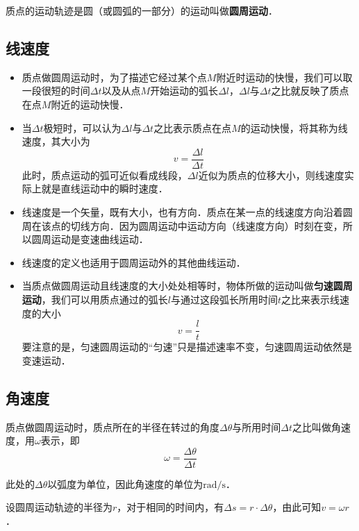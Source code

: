 
\begin{issues}
\issueDraft
\issueTODO
\end{issues}

质点的运动轨迹是圆（或圆弧的一部分）的运动叫做\textbf{圆周运动}．

\subsection{线速度}

\begin{itemize}
\item 质点做圆周运动时，为了描述它经过某个点$M$附近时运动的快慢，我们可以取一段很短的时间$\Delta t$以及从点$M$开始运动的弧长$\Delta l$，$\Delta l$与$\Delta t$之比就反映了质点在点$M$附近的运动快慢．

\item 当$\Delta t$极短时，可以认为$\Delta l$与$\Delta t$之比表示质点在点$M$的运动快慢，将其称为线速度，其大小为
\begin{equation}
v=\frac{\Delta l}{\Delta t}
\end{equation}
此时，质点运动的弧可近似看成线段，$\Delta l$近似为质点的位移大小，则线速度实际上就是直线运动中的瞬时速度．

\item 线速度是一个矢量，既有大小，也有方向．质点在某一点的线速度方向沿着圆周在该点的切线方向．因为圆周运动中运动方向（线速度方向）时刻在变，所以圆周运动是变速曲线运动．

\item 线速度的定义也适用于圆周运动外的其他曲线运动．

\item 当质点做圆周运动且线速度的大小处处相等时，物体所做的运动叫做\textbf{匀速圆周运动}，我们可以用质点通过的弧长$l$与通过这段弧长所用时间$t$之比来表示线速度的大小
\begin{equation}
v=\frac{l}{t}
\end{equation}
要注意的是，匀速圆周运动的“匀速”只是描述速率不变，匀速圆周运动依然是变速运动．
\end{itemize}

\subsection{角速度}

质点做圆周运动时，质点所在的半径在转过的角度$\Delta \theta$与所用时间$\Delta t$之比叫做角速度，用$\omega$表示，即
\begin{equation}
\omega = \frac{\Delta \theta}{\Delta t}
\end{equation}

此处的$\Delta \theta$以弧度为单位，因此角速度的单位为$\mathrm{rad/s}$．

设圆周运动轨迹的半径为$r$，对于相同的时间内，有$\Delta s=r \cdot \Delta \theta$，由此可知$v=\omega r$．
